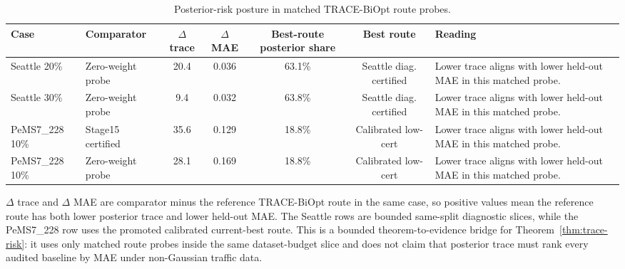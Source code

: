 \begin{table}[pos=htbp]
\centering
\caption{Posterior-risk posture in matched TRACE-BiOpt route probes.}
\label{tab:trace-biopt-posterior-risk}
\footnotesize
\begin{tabularx}{\textwidth}{llcccc>{\raggedright\arraybackslash}X}
\toprule
Case & Comparator & $\Delta$ trace & $\Delta$ MAE & Best-route posterior share & Best route & Reading \\
\midrule
Seattle 20\% & Zero-weight probe & 20.4 & 0.036 & 63.1\% & Seattle diag. certified & Lower trace aligns with lower held-out MAE in this matched probe. \\
Seattle 30\% & Zero-weight probe & 9.4 & 0.032 & 63.8\% & Seattle diag. certified & Lower trace aligns with lower held-out MAE in this matched probe. \\
PeMS7\_228 10\% & Stage15 certified & 35.6 & 0.129 & 18.8\% & Calibrated low-cert & Lower trace aligns with lower held-out MAE in this matched probe. \\
PeMS7\_228 10\% & Zero-weight probe & 28.1 & 0.169 & 18.8\% & Calibrated low-cert & Lower trace aligns with lower held-out MAE in this matched probe. \\
\bottomrule
\end{tabularx}
\begin{flushleft}\footnotesize $\Delta$ trace and $\Delta$ MAE are comparator minus the reference TRACE-BiOpt route in the same case, so positive values mean the reference route has both lower posterior trace and lower held-out MAE. The Seattle rows are bounded same-split diagnostic slices, while the PeMS7\_228 row uses the promoted calibrated current-best route. This is a bounded theorem-to-evidence bridge for Theorem~\ref{thm:trace-risk}: it uses only matched route probes inside the same dataset-budget slice and does not claim that posterior trace must rank every audited baseline by MAE under non-Gaussian traffic data.\end{flushleft}
\end{table}

